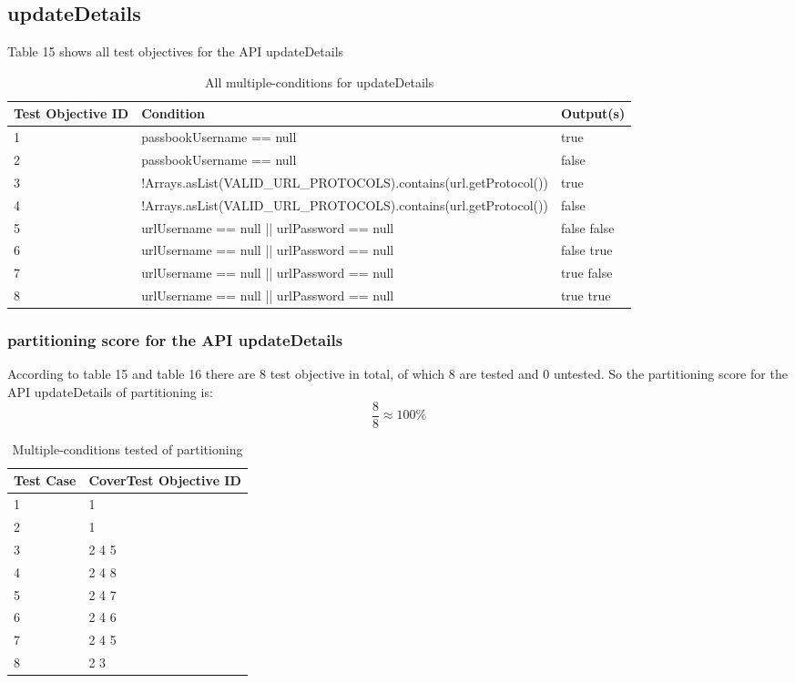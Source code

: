 \documentclass{article}
\begin{document}
\subsection{updateDetails}
Table 15 shows all test objectives for the API updateDetails
\begin{longtable}{|p{2cm}|p{11cm}|p{2cm}|}
\caption{All multiple-conditions for updateDetails}\\
\hline 
Test Objective ID&Condition&Output(s)\\
\hline  
1&passbookUsername == null&true\\
\hline
2&passbookUsername == null&false\\
\hline
3&!Arrays.asList(VALID\_URL\_PROTOCOLS).contains(url.getProtocol())&true\\
\hline
4&!Arrays.asList(VALID\_URL\_PROTOCOLS).contains(url.getProtocol())&false\\
\hline
5&urlUsername == null || urlPassword == null&false false\\
\hline
6&urlUsername == null || urlPassword == null&false true\\
\hline
7&urlUsername == null || urlPassword == null&true false\\
\hline
8&urlUsername == null || urlPassword == null&true true\\
\hline
\end{longtable}
\subsubsection{partitioning score for the API updateDetails}
According to table 15 and table 16 there are 8 test objective in total, of which 8 are tested and 0 untested. So the partitioning score for the API updateDetails of partitioning is:
$$\frac{8}{8}\approx100\%$$
\begin{longtable}{|p{2cm}|p{8cm}|}
\caption{Multiple-conditions tested of partitioning}\\
\hline 
Test Case& CoverTest Objective ID\\
\hline  
1&1\\
\hline
2&1\\
\hline
3&2 4 5\\
\hline
4&2 4 8\\
\hline
5&2 4 7\\
\hline
6&2 4 6\\
\hline
7&2 4 5\\
\hline
8&2 3\\
\hline
\end{longtable}
\end{document}
